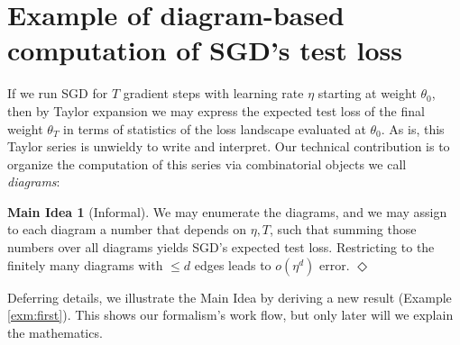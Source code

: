 \documentclass[openany, notitlepage, justified]{tufte-book}
\theoremstyle{plain}
\theoremstyle{definition}
\newtheorem*{midea*}{Main Idea}
\newcommand{\wasq}[1]{\left[#1\right]}
\newcommand{\expc}{\mathbb{E}}
\newcommand{\mend}{\hfill $\Diamond$}
\begin{document}
    \section{Example of diagram-based computation of SGD's test loss} \label{subsect:example}

        \newcommand{\nb} { \nabla }
        \newcommand{\lx} { l_x(\theta) }
        \newcommand{\teq} { \triangleq }
        \newcommand{\ex}[1] { \expc_x \wasq{#1} }

        If we run SGD for $T$ gradient steps with learning rate $\eta$ starting
        at weight $\theta_0$, then by Taylor expansion we may express the
        expected test loss of the final weight $\theta_T$ in terms of
        statistics of the loss landscape evaluated at $\theta_0$.
        As is, this Taylor series is unwieldy to write and interpret.
        Our technical contribution is to organize the computation of this
        series via combinatorial objects we call
        \emph{diagrams}:
        \begin{midea*}[Informal]
            We may enumerate the diagrams, and we may assign to
            each diagram a number that depends on $\eta, T$, such that
            summing those numbers over all diagrams yields SGD's expected test
            loss.  Restricting to the finitely many diagrams with $\leq d$
            edges leads to $o(\eta^d)$ error.
            \mend
        \end{midea*}

        Deferring details, we illustrate the Main Idea by deriving a new result
        (Example \ref{exm:first}).  This shows our formalism's work flow,
        but only later will we explain the mathematics.
\end{document}
